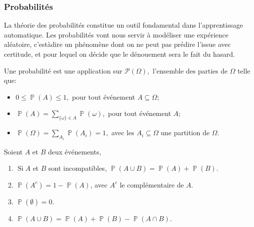 \documentclass[letterpaper,11pt,english]{sphinxmanual}
\begin{document}
\subsubsection{Probabilités}
\label{\detokenize{chapter2:probabilites}}
\begin{DUlineblock}{0em}
\item[] La théorie des probabilités constitue un outil fondamental dans
l’apprentissage automatique. Les probabilités vont nous servir à
modéliser une expérience aléatoire, c’est\sphinxhyphen{}à\sphinxhyphen{}dire un phénomène dont on
ne peut pas prédire l’issue avec certitude, et pour lequel on décide
que le dénouement sera le fait du hasard.
\item[] 
\item[] Une probabilité est une application sur \(\mathcal{P}(\Omega),\)
l’ensemble des parties de \(\Omega\) telle que:
\end{DUlineblock}
\begin{itemize}
\item {} 
\sphinxAtStartPar
\(0 \leq \operatorname{\mathbb{P}}(A) \leq 1,\) pour tout
événement \(A \subseteq \Omega\);

\item {} 
\sphinxAtStartPar
\(\operatorname{\mathbb{P}}(A)=\sum_{\{\omega\} \in A} \operatorname{\mathbb{P}}(\omega),\)
pour tout événement \(A\);

\item {} 
\sphinxAtStartPar
\(\operatorname{\mathbb{P}}(\Omega)=\sum_{A_{i}} \operatorname{\mathbb{P}}(A_{i})=1,\)
avec les \(A_{i} \subseteq \Omega\) une partition de
\(\Omega\).

\end{itemize}

\sphinxAtStartPar
{} Soient \(A\) et \(B\) deux événements,
\begin{enumerate}
%
\item {} 
\sphinxAtStartPar
\(\operatorname{Si} A\) et \(B\) sont incompatibles,
\(\operatorname{\mathbb{P}}(A \cup B)=\operatorname{\mathbb{P}}(A)+\operatorname{\mathbb{P}}(B).\)

\item {} 
\sphinxAtStartPar
\(\operatorname{\mathbb{P}}\left(A^{c}\right)=1-\operatorname{\mathbb{P}}(A)\),
avec \(A^{c}\) le complémentaire de \(A\).

\item {} 
\sphinxAtStartPar
\(\operatorname{\mathbb{P}}(\emptyset)=0.\)

\item {} 
\sphinxAtStartPar
\(\operatorname{\mathbb{P}}(A \cup B)=\operatorname{\mathbb{P}}(A)+\operatorname{\mathbb{P}}(B)-\operatorname{\mathbb{P}}(A \cap B).\)

\end{enumerate}
\end{document}
